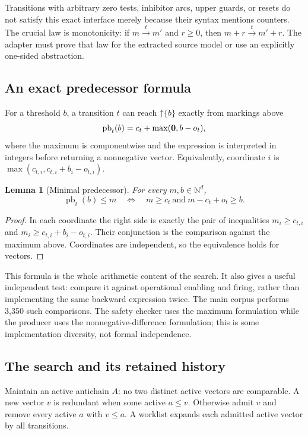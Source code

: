 \documentclass[11pt,a4paper]{article}
\newtheorem{lemma}[theorem]{Lemma}
\theoremstyle{definition}\newtheorem{definition}[theorem]{Definition}
\theoremstyle{remark}\newtheorem{remark}[theorem]{Remark}
\newcommand{\N}{\mathbb N}\newcommand{\Q}{\mathbb Q}\newcommand{\R}{\mathbb R}
\newcommand{\up}[1]{\mathord{\uparrow}#1}
\begin{document}
Transitions with arbitrary zero tests, inhibitor arcs, upper guards, or resets do not satisfy this exact interface merely because their syntax mentions counters. The crucial law is monotonicity: if $m\xrightarrow{t}m'$ and $r\ge0$, then $m+r\xrightarrow{t}m'+r$. The adapter must prove that law for the extracted source model or use an explicitly one-sided abstraction.

\subsection{An exact predecessor formula}
For a threshold $b$, a transition $t$ can reach $\up{\{b\}}$ exactly from markings above
\begin{equation}
 \label{eq:pb}
 \operatorname{pb}_t(b)=c_t+\max(\mathbf 0,b-o_t),
\end{equation}
where the maximum is componentwise and the expression is interpreted in integers before returning a nonnegative vector. Equivalently, coordinate $i$ is $\max(c_{t,i},c_{t,i}+b_i-o_{t,i})$.

\begin{lemma}[Minimal predecessor]
\label{lem:pred}
For every $m,b\in\N^d$,
\[
 \operatorname{pb}_t(b)\le m
 \quad\Longleftrightarrow\quad
 m\ge c_t\ \text{and}\ m-c_t+o_t\ge b.
\]
\end{lemma}
\begin{proof}
In each coordinate the right side is exactly the pair of inequalities
$m_i\ge c_{t,i}$ and $m_i\ge c_{t,i}+b_i-o_{t,i}$. Their conjunction is the comparison against the maximum above. Coordinates are independent, so the equivalence holds for vectors.
\end{proof}

This formula is the whole arithmetic content of the search. It also gives a useful independent test: compare it against operational enabling and firing, rather than implementing the same backward expression twice. The main corpus performs 3,350 such comparisons. The safety checker uses the maximum formulation while the producer uses the nonnegative-difference formulation; this is some implementation diversity, not formal independence.

\subsection{The search and its retained history}
Maintain an active antichain $A$: no two distinct active vectors are comparable. A new vector $v$ is redundant when some active $a\le v$. Otherwise admit $v$ and remove every active $a$ with $v\le a$. A worklist expands each admitted active vector by all transitions.
\end{document}
